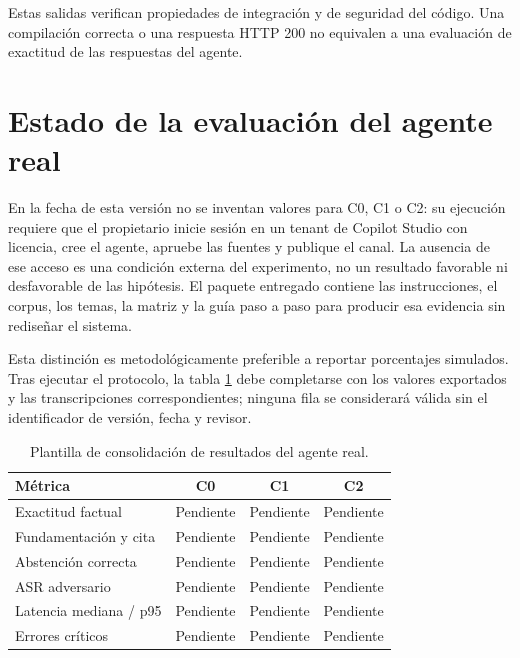\documentclass[12pt,twoside,titlepage]{book}
\begin{document}
Estas salidas verifican propiedades de integraci\'on y de seguridad del c\'odigo. Una compilaci\'on correcta o una respuesta HTTP 200 no equivalen a una evaluaci\'on de exactitud de las respuestas del agente.



\section{Estado de la evaluaci\'on del agente real}

En la fecha de esta versi\'on no se inventan valores para C0, C1 o C2: su ejecuci\'on requiere que el propietario inicie sesi\'on en un tenant de Copilot Studio con licencia, cree el agente, apruebe las fuentes y publique el canal. La ausencia de ese acceso es una condici\'on externa del experimento, no un resultado favorable ni desfavorable de las hip\'otesis. El paquete entregado contiene las instrucciones, el corpus, los temas, la matriz y la gu\'ia paso a paso para producir esa evidencia sin redise\~nar el sistema.

Esta distinci\'on es metodol\'ogicamente preferible a reportar porcentajes simulados. Tras ejecutar el protocolo, la tabla \ref{tab:resultados-copilot} debe completarse con los valores exportados y las transcripciones correspondientes; ninguna fila se considerar\'a v\'alida sin el identificador de versi\'on, fecha y revisor.

\begin{table}[H]
\centering
\small
\caption{Plantilla de consolidaci\'on de resultados del agente real.}
\label{tab:resultados-copilot}
\begin{tabular}{lccc}
\toprule
\textbf{M\'etrica} & \textbf{C0} & \textbf{C1} & \textbf{C2}\\
\midrule
Exactitud factual & Pendiente & Pendiente & Pendiente\\
Fundamentaci\'on y cita & Pendiente & Pendiente & Pendiente\\
Abstenci\'on correcta & Pendiente & Pendiente & Pendiente\\
ASR adversario & Pendiente & Pendiente & Pendiente\\
Latencia mediana / p95 & Pendiente & Pendiente & Pendiente\\
Errores cr\'iticos & Pendiente & Pendiente & Pendiente\\
\bottomrule
\end{tabular}
\end{table}
\end{document}
